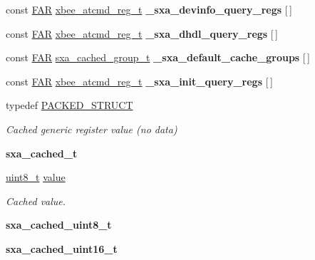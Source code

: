 \begin{DoxyCompactItemize}
const \hyperlink{group__hal_gaef060b3456fdcc093a7210a762d5f2ed}{F\+AR} \hyperlink{structxbee__atcmd__reg__t}{xbee\+\_\+atcmd\+\_\+reg\+\_\+t} {\bfseries \+\_\+sxa\+\_\+devinfo\+\_\+query\+\_\+regs} \mbox{[}$\,$\mbox{]}
\item 
const \hyperlink{group__hal_gaef060b3456fdcc093a7210a762d5f2ed}{F\+AR} \hyperlink{structxbee__atcmd__reg__t}{xbee\+\_\+atcmd\+\_\+reg\+\_\+t} {\bfseries \+\_\+sxa\+\_\+dhdl\+\_\+query\+\_\+regs} \mbox{[}$\,$\mbox{]}
\item 
const \hyperlink{group__hal_gaef060b3456fdcc093a7210a762d5f2ed}{F\+AR} \hyperlink{structsxa__cached__group__t}{sxa\+\_\+cached\+\_\+group\+\_\+t} {\bfseries \+\_\+sxa\+\_\+default\+\_\+cache\+\_\+groups} \mbox{[}$\,$\mbox{]}
\item 
const \hyperlink{group__hal_gaef060b3456fdcc093a7210a762d5f2ed}{F\+AR} \hyperlink{structxbee__atcmd__reg__t}{xbee\+\_\+atcmd\+\_\+reg\+\_\+t} {\bfseries \+\_\+sxa\+\_\+init\+\_\+query\+\_\+regs} \mbox{[}$\,$\mbox{]}
\item 
typedef \hyperlink{group___s_x_a_ga4233297bd31be5c273d4fb0758cc54d7}{P\+A\+C\+K\+E\+D\+\_\+\+S\+T\+R\+U\+CT}
\begin{DoxyCompactList}\small\item\em Cached generic register value (no data) \end{DoxyCompactList}\item 
\mbox{\label{group___s_x_a_ga96e5f9309b5a697a88199927d4ababa3}} 
{\bfseries sxa\+\_\+cached\+\_\+t}
\item 
\mbox{\label{group___s_x_a_ga810fe9819dfe66daa9ce4981812b46c3}} 
\hyperlink{group__hal__dos_gae1affc9ca37cfb624959c866a73f83c2}{uint8\+\_\+t} \hyperlink{group___s_x_a_ga810fe9819dfe66daa9ce4981812b46c3}{value}
\begin{DoxyCompactList}\small\item\em Cached value. \end{DoxyCompactList}\item 
\mbox{\label{group___s_x_a_gac74fc48f2d0a7772b891264671bff3db}} 
{\bfseries sxa\+\_\+cached\+\_\+uint8\+\_\+t}
\item 
\mbox{\label{group___s_x_a_ga3d2a91f4eb47232935501ac9a8711659}} 
{\bfseries sxa\+\_\+cached\+\_\+uint16\+\_\+t}
\item 

\end{DoxyCompactItemize}
